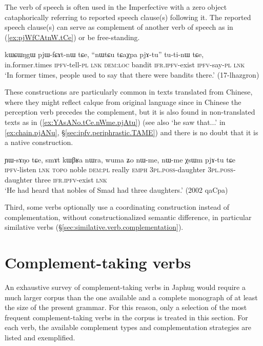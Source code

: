 The verb of speech  is often used in the Imperfective with a zero object cataphorically referring to reported speech clause(s) following it. The reported speech clause(s) can serve as complement of another verb of speech as in (\ref{ex:pjWfCAtnW.tCe}) or be free-standing.

\begin{exe}
	\ex \label{ex:pjWfCAtnW.tCe}
	\gll kɯɕɯŋgɯ pjɯ-fɕɤt-nɯ tɕe, ``nɯtɕu tɕaχpa pjɤ-tu'' tu-ti-nɯ tɕe,  \\
	in.former.times \textsc{ipfv}-tell-\textsc{pl} \textsc{lnk} \textsc{dem}:\textsc{loc} bandit \textsc{ifr}.\textsc{ipfv}-exist \textsc{ipfv}-say-\textsc{pl} \textsc{lnk} \\
	\glt `In former times, people used to say that there were bandits there.' (17-lhazgron)
\end{exe}

These constructions are particularly common in texts translated from Chinese, where they might reflect calque from original language since in Chinese the perception verb precedes the complement, but it is also found in non-translated texts as in (\ref{ex:YAsANo.tCe.nWme.pjAtu}) (see also  `he saw that...' in  \ref{ex:chain.pjANu}, §\ref{sec:ipfv.periphrastic.TAME}) and there is no doubt that it is a native construction.

\begin{exe}
	\ex \label{ex:YAsANo.tCe.nWme.pjAtu}
	\gll ɲɯ-sɤŋo tɕe, smɤt kɯβʁa nɯra, wuma ʑo nɯ-me, nɯ-me χsɯm pjɤ-tu tɕe \\
	\textsc{ipfv}-listen \textsc{lnk}  \textsc{topo} noble \textsc{dem}:\textsc{pl} really \textsc{emph} \textsc{3pl}.\textsc{poss}-daughter  \textsc{3pl}.\textsc{poss}-daughter  three \textsc{ifr}.\textsc{ipfv}-exist \textsc{lnk} \\
	\glt `He had heard that nobles of Smad had three daughters.' (2002 qaCpa) 
\end{exe}

Third, some verbs optionally use a coordinating construction instead of complementation, without constructionalized semantic difference, in particular similative verbs (§\ref{sec:similative.verb.complementation}).


\section{Complement-taking verbs} \label{sec:complement.taking.verbs}
An exhaustive survey of com\-ple\-ment-taking verbs in Japhug would require a much larger corpus than the one available and a complete monograph of at least the size of the present grammar. For this reason, only a selection of the most frequent com\-ple\-ment-taking verbs in the corpus is treated in this section. For each verb, the available complement types and complementation strategies are listed and exemplified.

